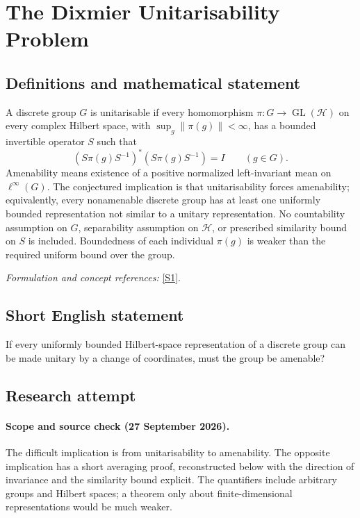 \documentclass[11pt]{article}
\begin{document}
\section*{\texorpdfstring{The Dixmier Unitarisability Problem}{The Dixmier Unitarisability Problem}}\label{30004208}
\subsection{Definitions and mathematical statement}
A discrete group $G$ is unitarisable if every homomorphism $\pi:G\to\operatorname{GL}(\mathcal H)$ on every complex Hilbert space, with $\sup_g\|\pi(g)\|<\infty$, has a bounded invertible operator $S$ such that
\[
 (S\pi(g)S^{-1})^*(S\pi(g)S^{-1})=I\qquad(g\in G).
\]
Amenability means existence of a positive normalized left-invariant mean on $\ell^\infty(G)$. The conjectured implication is that unitarisability forces amenability; equivalently, every nonamenable discrete group has at least one uniformly bounded representation not similar to a unitary representation. No countability assumption on $G$, separability assumption on $\mathcal H$, or prescribed similarity bound on $S$ is included. Boundedness of each individual $\pi(g)$ is weaker than the required uniform bound over the group.
\par\smallskip\textit{Formulation and concept references:} \href{https://arxiv.org/pdf/0902.4585v1}{[S1]}.

\subsection{Short English statement}
If every uniformly bounded Hilbert-space representation of a discrete group can be made unitary by a change of coordinates, must the group be amenable?
\subsection{Research attempt}
\paragraph{Scope and source check (27 September 2026).}
The difficult implication is from unitarisability to amenability. The
opposite implication has a short averaging proof, reconstructed below
with the direction of invariance and the similarity bound explicit.
The quantifiers include arbitrary groups and Hilbert spaces; a theorem
only about finite-dimensional representations would be much weaker.
\end{document}
